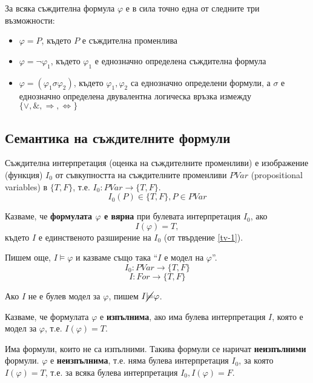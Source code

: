 \documentclass{article}
\begin{document}
\begin{mydef}
За всяка съждителна формула $\varphi$ е в сила точно една от следните три възможности:
\begin{itemize}
\item $\varphi = P$, където $P$ е съждителна променлива
\item $\varphi = \neg\varphi_1$, където $\varphi_1$ е еднозначно определена съждителна формула
\item $\varphi = (\varphi_1 \sigma \varphi_2)$, където $\varphi_1, \varphi_2$ са еднозначно определени формули, а $\sigma$ е еднозначно определена двувалентна логическа връзка измежду $\{\lor, \&, \Rightarrow, \Leftrightarrow\}$
\end{itemize}
\end{mydef}

\subsection*{Семантика на съждителните формули}

\begin{mydef}
Съждителна интерпретация (оценка на съждителните променливи) е изображение (функция) $I_0$ от съвкупността на съждителните променливи $PVar$ (propositional variables) в $\{ T, F \}$, т.е. $I_0: PVar \longrightarrow \{T, F\}$.
\[
I_0(P) \in \{ T, F \}, P \in PVar
\]
\end{mydef}

\begin{mydef}
Казваме, че \textbf{формулата $\varphi$ е вярна} при булевата интерпретация $I_0$, ако
\[
I(\varphi) = T,
\]
където $I$ е единственото разширение на $I_0$ (от твърдение \ref{tv-1}). 

Пишем още, $I \models \varphi$ и казваме също така ``$I$ е модел на $\varphi$''.
\[
I_0 : PVar \rightarrow \{T, F\} \]
\[
I : For \rightarrow \{T, F\}
\]

Ако $I$ не е булев модел за $\varphi$, пишем $I \cancel{\models} \varphi$.
\end{mydef}

\begin{mydef}[Изпълнимост]
Казваме, че формулата $\varphi$ е \textbf{изпълнима}, ако има булева интерпретация $I$, която е модел за $\varphi$, т.е. $I(\varphi) = T$.

Има формули, които не са изпълними. Такива формули се наричат \textbf{неизпълними} формули. $\varphi$ е \textbf{неизпълнима}, т.е. няма булева интерпретация $I_0$, за която $I(\varphi) = T$, т.е. за всяка булева интерпретация $I_0, I(\varphi) = F$.
\end{mydef}
\end{document}
